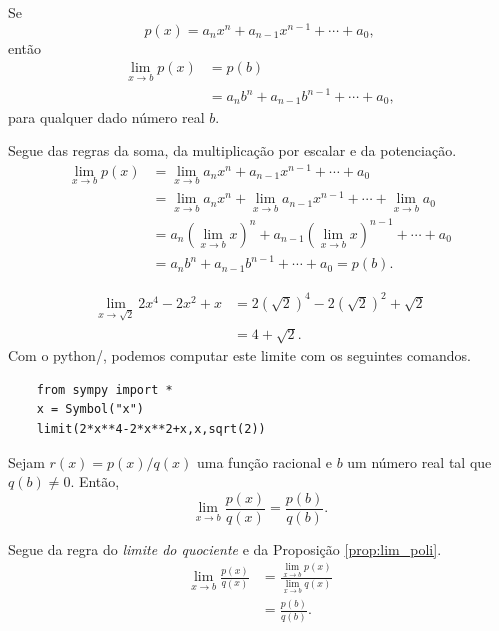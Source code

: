 \begin{prop}\label{prop:lim_poli}
  Se
  \begin{equation}
    p(x) = a_nx^n + a_{n-1}x^{n-1} + \cdots + a_0,
  \end{equation}
  então
  \begin{align}
    \lim_{x\to b} p(x) &= p(b)\\
                       &= a_nb^n + a_{n-1}b^{n-1} + \cdots + a_0,
  \end{align}
  para qualquer dado número real $b$.
\end{prop}
\begin{dem}
  Segue das regras da soma, da multiplicação por escalar e da potenciação.
  \begin{align}
    \lim_{x\to b} p(x) &= \lim_{x\to b} a_nx^n + a_{n-1}x^{n-1} + \cdots + a_0\\
                       &= \lim_{x\to b} a_nx^n + \lim_{x\to b} a_{n-1}x^{n-1} + \cdots + \lim_{x\to b} a_0\\
                       &= a_n\left(\lim_{x\to b} x\right)^n + a_{n-1}\left(\lim_{x\to b} x\right)^{n-1} + \cdots + a_0\\
                       &= a_nb^n + a_{n-1}b^{n-1} + \cdots + a_0 = p(b).
  \end{align}
\end{dem}

\begin{ex}
  \begin{align}
    \lim_{x\to \sqrt{2}} 2x^4 - 2x^2 + x &= 2(\sqrt{2})^4 - 2(\sqrt{2})^2 + \sqrt{2}\\
                                         &= 4+\sqrt{2}.
  \end{align}
  \ifispython
  Com o {python}/{\sympy}, podemos computar este limite com os seguintes comandos.
  \begin{lstlisting}
    from sympy import *
    x = Symbol("x")
    limit(2*x**4-2*x**2+x,x,sqrt(2))
  \end{lstlisting}
  \fi
\end{ex}

\begin{prop}
  Sejam $r(x) = p(x)/q(x)$ uma função racional e $b$ um número real tal que $q(b)\neq 0$. Então,
  \begin{equation}
    \lim_{x\to b} \frac{p(x)}{q(x)} = \frac{p(b)}{q(b)}.
  \end{equation}
\end{prop}
\begin{dem}
  Segue da regra do \emph{limite do quociente} e da Proposição \ref{prop:lim_poli}.
  \begin{align}
    \lim_{x\to b} \frac{p(x)}{q(x)} &= \frac{\displaystyle\lim_{x\to b} p(x)}{\displaystyle\lim_{x\to b} q(x)} \\
                                    &= \frac{p(b)}{q(b)}.
  \end{align}
\end{dem}

